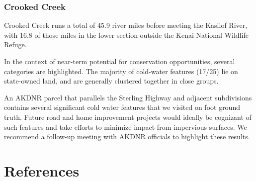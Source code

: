 \documentclass[
  letterpaper,
  DIV=11,
  numbers=noendperiod]{scrreprt}
\begin{document}
\hypertarget{crooked-creek}{%
\subsection{Crooked Creek}\label{crooked-creek}}

Crooked Creek runs a total of 45.9 river miles before meeting the
Kasilof River, with 16.8 of those miles in the lower section outside the
Kenai National Wildlife Refuge.

In the context of near-term potential for conservation opportunities,
several categories are highlighted. The majority of cold-water features
(17/25) lie on state-owned land, and are generally clustered together in
close groups.

An AKDNR parcel that parallels the Sterling Highway and adjacent
subdivisions contains several significant cold water features that we
visited on foot ground truth. Future road and home improvement projects
would ideally be cognizant of such features and take efforts to minimize
impact from impervious surfaces. We recommend a follow-up meeting with
AKDNR officials to highlight these results.


\hypertarget{references}{%
\chapter*{References}\label{references}}

\end{document}
